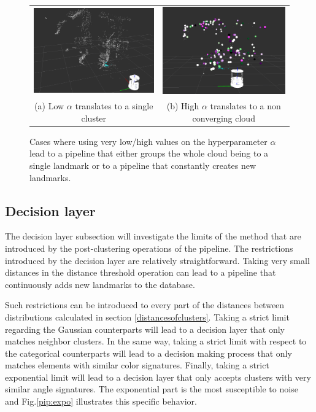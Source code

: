 \documentclass[twoside,hidelinks]{article}
\begin{document}
\begin{figure}
\begin{tabular}{cc}
    \includegraphics[width=.5\textwidth]{singlecluster} &  \includegraphics[width=.5\textwidth]{onlyclusters2} \\
  (a) Low $\alpha$ translates to a single cluster  & (b) High $\alpha$ translates to a non converging cloud \\[6pt]
\end{tabular}
\caption{Cases where using very low/high values on the hyperparameter $\alpha$ lead to a pipeline that either groups the whole cloud being to a single landmark or to a pipeline that constantly creates new landmarks.}
  \label{pip:limits}
\end{figure}

\subsection{Decision layer}


The decision layer subsection will investigate the limits of the method that are introduced by the post-clustering operations of the pipeline.
The restrictions introduced by the decision layer are relatively straightforward. Taking very small distances in the distance threshold operation can lead to a pipeline that continuously adds new landmarks to the database. 

Such restrictions can be introduced to every part of the distances between distributions calculated in section \ref{distancesofclusters}. Taking a strict limit regarding the Gaussian counterparts will lead to a decision layer that only matches neighbor clusters. In the same way, taking a strict limit with respect to the categorical counterparts will lead to a decision making process that only matches elements with similar color signatures. Finally, taking a strict exponential limit will lead to a decision layer that only accepts clusters with very similar angle signatures.
The exponential part is the most susceptible to noise and Fig.\ref{pip:expo} illustrates this specific behavior.
\end{document}
